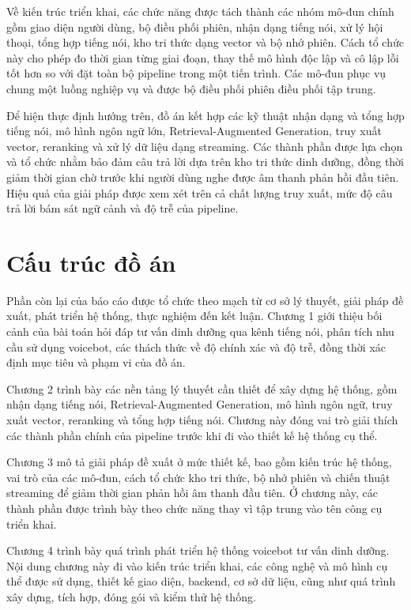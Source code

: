 \documentclass[a4paper,13pt,twoside]{report}
\begin{document}
Về kiến trúc triển khai, các chức năng được tách thành các nhóm mô-đun chính gồm giao diện người dùng, bộ điều phối phiên, nhận dạng tiếng nói, xử lý hội thoại, tổng hợp tiếng nói, kho tri thức dạng vector và bộ nhớ phiên. Cách tổ chức này cho phép đo thời gian từng giai đoạn, thay thế mô hình độc lập và cô lập lỗi tốt hơn so với đặt toàn bộ pipeline trong một tiến trình. Các mô-đun phục vụ chung một luồng nghiệp vụ và được bộ điều phối phiên điều phối tập trung.

Để hiện thực định hướng trên, đồ án kết hợp các kỹ thuật nhận dạng và tổng hợp tiếng nói, mô hình ngôn ngữ lớn, Retrieval-Augmented Generation, truy xuất vector, reranking và xử lý dữ liệu dạng streaming. Các thành phần được lựa chọn và tổ chức nhằm bảo đảm câu trả lời dựa trên kho tri thức dinh dưỡng, đồng thời giảm thời gian chờ trước khi người dùng nghe được âm thanh phản hồi đầu tiên. Hiệu quả của giải pháp được xem xét trên cả chất lượng truy xuất, mức độ câu trả lời bám sát ngữ cảnh và độ trễ của pipeline.

\section{Cấu trúc đồ án}

Phần còn lại của báo cáo được tổ chức theo mạch từ cơ sở lý thuyết, giải pháp đề xuất, phát triển hệ thống, thực nghiệm đến kết luận. Chương 1 giới thiệu bối cảnh của bài toán hỏi đáp tư vấn dinh dưỡng qua kênh tiếng nói, phân tích nhu cầu sử dụng voicebot, các thách thức về độ chính xác và độ trễ, đồng thời xác định mục tiêu và phạm vi của đồ án.

Chương 2 trình bày các nền tảng lý thuyết cần thiết để xây dựng hệ thống, gồm nhận dạng tiếng nói, Retrieval-Augmented Generation, mô hình ngôn ngữ, truy xuất vector, reranking và tổng hợp tiếng nói. Chương này đóng vai trò giải thích các thành phần chính của pipeline trước khi đi vào thiết kế hệ thống cụ thể.

Chương 3 mô tả giải pháp đề xuất ở mức thiết kế, bao gồm kiến trúc hệ thống, vai trò của các mô-đun, cách tổ chức kho tri thức, bộ nhớ phiên và chiến thuật streaming để giảm thời gian phản hồi âm thanh đầu tiên. Ở chương này, các thành phần được trình bày theo chức năng thay vì tập trung vào tên công cụ triển khai.

Chương 4 trình bày quá trình phát triển hệ thống voicebot tư vấn dinh dưỡng. Nội dung chương này đi vào kiến trúc triển khai, các công nghệ và mô hình cụ thể được sử dụng, thiết kế giao diện, backend, cơ sở dữ liệu, cũng như quá trình xây dựng, tích hợp, đóng gói và kiểm thử hệ thống.
\end{document}
